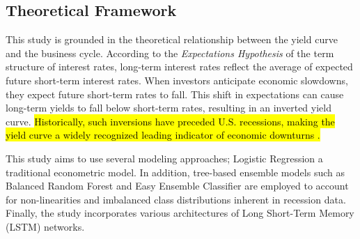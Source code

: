 
\newpage

\subsection{Theoretical Framework}
This study is grounded in the theoretical relationship between the yield curve and the business cycle. According to the \textit{Expectations Hypothesis} of the term structure of interest rates, long-term interest rates reflect the average of expected future short-term interest rates. When investors anticipate economic slowdowns, they expect future short-term rates to fall. This shift in expectations can cause long-term yields to fall below short-term rates, resulting in an inverted yield curve. \hl{Historically, such inversions have preceded U.S. recessions, making the yield curve a widely recognized leading indicator of economic downturns \parencite{estrella1998predicting}.}

This study aims to use several modeling approaches; Logistic Regression a traditional econometric model. In addition, tree-based ensemble models such as Balanced Random Forest and Easy Ensemble Classifier are employed to account for non-linearities and imbalanced class distributions inherent in recession data. Finally, the study incorporates various architectures of Long Short-Term Memory (LSTM) networks. 



